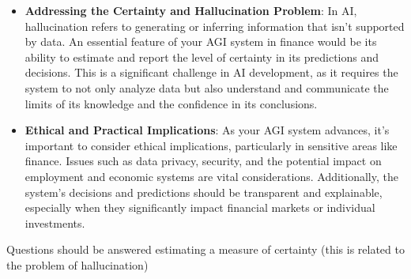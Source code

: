 \documentclass[11pt, reqno]{amsart}
\theoremstyle{definition}
\theoremstyle{remark}
\begin{document}
\begin{itemize}
		\item \textbf{Addressing the Certainty and Hallucination Problem}: In AI,
			hallucination refers to generating or inferring information that isn't
			supported by data. An essential feature of your AGI system in finance
			would be its ability to estimate and report the level of certainty in
			its predictions and decisions. This is a significant challenge in AI
			development, as it requires the system to not only analyze data but also
			understand and communicate the limits of its knowledge and the confidence
			in its conclusions.

		\item \textbf{Ethical and Practical Implications}: As your AGI system advances,
			it's important to consider ethical implications, particularly in sensitive
			areas like finance. Issues such as data privacy, security, and the
			potential impact on employment and economic systems are vital
			considerations. Additionally, the system's decisions and predictions
			should be transparent and explainable, especially when they significantly
			impact financial markets or individual investments.
	\end{itemize}

	Questions should be answered estimating a measure of certainty (this is related
	to the problem of hallucination)
\end{document}
